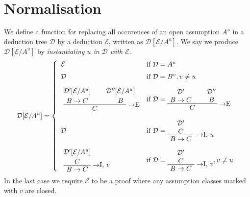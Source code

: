 \pagebreak
\section{Normalisation}

\begin{definition}
We define a function for replacing all occurences of an open assumption $A^u$ in
a deduction tree $\mathcal{D}$ by a deduction $\mathcal{E}$, written as
$\mathcal{D}[\mathcal{E}/A^u]$. We say we produce $\mathcal{D}[\mathcal{E}/A^u]$
by \textit{instantiating $u$ in $\mathcal{D}$ with $\mathcal{E}$}.
\[
  \mathcal{D}[\mathcal{E}/A^u] =
  \left\{
  \begin{array}{ll}
  \mathcal{E} & \mbox{if } \mathcal{D} = A^u \\[6pt]
  \mathcal{D} & \mbox{if } \mathcal{D} = B^v, v \neq u \\[10pt]
  \AxiomC{$\mathcal{D}'[\mathcal{E}/A^u]$}
  \noLine
  \UnaryInfC{$B \to C$}
  \AxiomC{$\mathcal{D}''[\mathcal{E}/A^u]$}
  \noLine
  \UnaryInfC{$B$}
  \RightLabel{$\to$E}
  \BinaryInfC{$C$}
  \DisplayProof & \mbox{if } \mathcal{D} =
    \AxiomC{$\mathcal{D}'$}
    \noLine
    \UnaryInfC{$B \to C$}
    \AxiomC{$\mathcal{D}''$}
    \noLine
    \UnaryInfC{$B$}
    \RightLabel{$\to$E}
    \BinaryInfC{$C$}
    \DisplayProof \\[24pt]
  \mathcal{D} & \mbox{if } \mathcal{D} =
    \AxiomC{$\mathcal{D}'$}
    \noLine
    \UnaryInfC{$C$}
    \RightLabel{$\to$I, $u$}
    \UnaryInfC{$B \to C$}
    \DisplayProof \\[20pt]
  \AxiomC{$\mathcal{D}'[\mathcal{E}/A^u]$}
  \noLine
  \UnaryInfC{$C$}
  \RightLabel{$\to$I, $v$}
  \UnaryInfC{$B \to C$}
  \DisplayProof & \mbox{if } \mathcal{D} =
    \AxiomC{$\mathcal{D}'$}
    \noLine
    \UnaryInfC{$C$}
    \RightLabel{$\to$I, $v$}
    \UnaryInfC{$B \to C$}
    \DisplayProof, v \neq u
  \end{array}
  \right.
\]
In the last case we require $\mathcal{E}$ to be a proof where any assumption
classes marked with $v$ are closed.
\end{definition}

